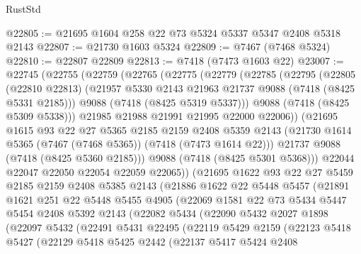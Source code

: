 \begin{lexlean}{RustStd}
\begin{coremodule}
@22805 := @21695 @1604 @258 @22 @73 @5324 @5337 @5347 @2408 @5318 @2143
@22807 := @21730 @1603 @5324
@22809 := @7467 (@7468 @5324)
@22810 := @22807 @22809
@22813 := @7418 (@7473 @1603 @22)
@23007 := @22745
    (@22755
      (@22759
        (@22765
          (@22775
            (@22779
              (@22785
                (@22795
                  (@22805
                    (@22810 @22813)
                    (@21957 @5330 @2143 @21963 @21737 @9088 (@7418 (@8425 @5331 @2185)))
                    @9088
                    (@7418 (@8425 @5319 @5337)))
                  @9088
                  (@7418 (@8425 @5309 @5338)))
                @21985
                @21988
                @21991
                @21995
                @22000
                @22006))
            (@21695
              @1615
              @93
              @22
              @27
              @5365
              @2185
              @2159
              @2408
              @5359
              @2143
              (@21730 @1614 @5365 (@7467 (@7468 @5365)) (@7418 (@7473 @1614 @22)))
              @21737
              @9088
              (@7418 (@8425 @5360 @2185)))
            @9088
            (@7418 (@8425 @5301 @5368)))
          @22044
          @22047
          @22050
          @22054
          @22059
          @22065))
      (@21695
        @1622
        @93
        @22
        @27
        @5459
        @2185
        @2159
        @2408
        @5385
        @2143
        (@21886
          @1622
          @22
          @5448
          @5457
          (@21891
            @1621
            @251
            @22
            @5448
            @5455
            @4905
            (@22069
              @1581
              @22
              @73
              @5434
              @5447
              @5454
              @2408
              @5392
              @2143
              (@22082
                @5434
                (@22090
                  @5432
                  @2027
                  @1898
                  (@22097
                    @5432
                    (@22491
                      @5431
                      @22495
                      (@22119
                        @5429
                        @2159
                        (@22123
                          @5418
                          @5427
                          (@22129
                            @5418
                            @5425
                            @2442
                            (@22137
                              @5417
                              @5424
                              @2408

\end{coremodule}
\end{lexlean}
